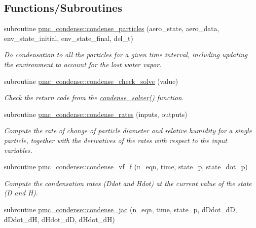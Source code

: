 \subsection*{Functions/\+Subroutines}
\begin{DoxyCompactItemize}
\item 
subroutine \mbox{\hyperlink{namespacepmc__condense_a45e6b6e779962d0671313395a22a3ef6}{pmc\+\_\+condense\+::condense\+\_\+particles}} (aero\+\_\+state, aero\+\_\+data, env\+\_\+state\+\_\+initial, env\+\_\+state\+\_\+final, del\+\_\+t)
\begin{DoxyCompactList}\small\item\em Do condensation to all the particles for a given time interval, including updating the environment to account for the lost water vapor. \end{DoxyCompactList}\item 
subroutine \mbox{\hyperlink{namespacepmc__condense_afc45edd4ee290a743c722977accc1f5c}{pmc\+\_\+condense\+::condense\+\_\+check\+\_\+solve}} (value)
\begin{DoxyCompactList}\small\item\em Check the return code from the \mbox{\hyperlink{condense__solver_8c_a2b18e4f55610de6bcaf2a7eb954cf7aa}{condense\+\_\+solver()}} function. \end{DoxyCompactList}\item 
subroutine \mbox{\hyperlink{namespacepmc__condense_a2ec10eca18f9bc6bd906329e1574afef}{pmc\+\_\+condense\+::condense\+\_\+rates}} (inputs, outputs)
\begin{DoxyCompactList}\small\item\em Compute the rate of change of particle diameter and relative humidity for a single particle, together with the derivatives of the rates with respect to the input variables. \end{DoxyCompactList}\item 
subroutine \mbox{\hyperlink{namespacepmc__condense_a2e3c9253c59b92f29d8458f127e3014e}{pmc\+\_\+condense\+::condense\+\_\+vf\+\_\+f}} (n\+\_\+eqn, time, state\+\_\+p, state\+\_\+dot\+\_\+p)
\begin{DoxyCompactList}\small\item\em Compute the condensation rates (Ddot and Hdot) at the current value of the state (D and H). \end{DoxyCompactList}\item 
subroutine \mbox{\hyperlink{namespacepmc__condense_a31f63a235637d397e5f29aa2333db17d}{pmc\+\_\+condense\+::condense\+\_\+jac}} (n\+\_\+eqn, time, state\+\_\+p, d\+Ddot\+\_\+dD, d\+Ddot\+\_\+dH, d\+Hdot\+\_\+dD, d\+Hdot\+\_\+dH)

\end{DoxyCompactItemize}
